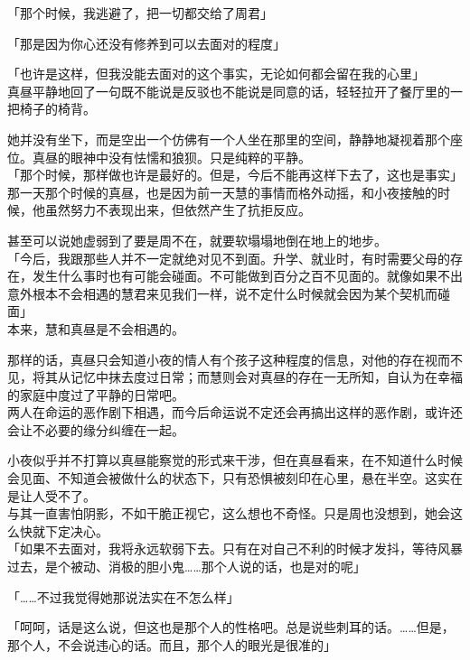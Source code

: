 「那个时候，我逃避了，把一切都交给了周君」

「那是因为你心还没有修养到可以去面对的程度」

「也许是这样，但我没能去面对的这个事实，无论如何都会留在我的心里」\\

真昼平静地回了一句既不能说是反驳也不能说是同意的话，轻轻拉开了餐厅里的一把椅子的椅背。

她并没有坐下，而是空出一个仿佛有一个人坐在那里的空间，静静地凝视着那个座位。真昼的眼神中没有怯懦和狼狈。只是纯粹的平静。\\

「那个时候，那样做也许是最好的。但是，今后不能再这样下去了，这也是事实」\\

那一天那个时候的真昼，也是因为前一天慧的事情而格外动摇，和小夜接触的时候，他虽然努力不表现出来，但依然产生了抗拒反应。

甚至可以说她虚弱到了要是周不在，就要软塌塌地倒在地上的地步。\\

「今后，我跟那些人并不一定就绝对见不到面。升学、就业时，有时需要父母的存在，发生什么事时也有可能会碰面。不可能做到百分之百不见面的。就像如果不出意外根本不会相遇的慧君来见我们一样，说不定什么时候就会因为某个契机而碰面」\\

本来，慧和真昼是不会相遇的。

那样的话，真昼只会知道小夜的情人有个孩子这种程度的信息，对他的存在视而不见，将其从记忆中抹去度过日常；而慧则会对真昼的存在一无所知，自认为在幸福的家庭中度过了平静的日常吧。\\

两人在命运的恶作剧下相遇，而今后命运说不定还会再搞出这样的恶作剧，或许还会让不必要的缘分纠缠在一起。

小夜似乎并不打算以真昼能察觉的形式来干涉，但在真昼看来，在不知道什么时候会见面、不知道会被做什么的状态下，只有恐惧被刻印在心里，悬在半空。这实在是让人受不了。\\

与其一直害怕阴影，不如干脆正视它，这么想也不奇怪。只是周也没想到，她会这么快就下定决心。\\

「如果不去面对，我将永远软弱下去。只有在对自己不利的时候才发抖，等待风暴过去，是个被动、消极的胆小鬼……那个人说的话，也是对的呢」

「……不过我觉得她那说法实在不怎么样」

「呵呵，话是这么说，但这也是那个人的性格吧。总是说些刺耳的话。……但是，那个人，不会说违心的话。而且，那个人的眼光是很准的」\\

